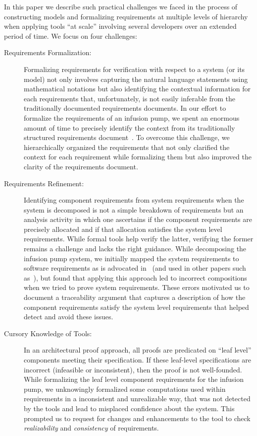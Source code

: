In this paper we describe such practical challenges we faced in the process of constructing models and formalizing requirements at multiple levels of hierarchy when applying tools ``at scale'' involving several developers over an extended period of time.  We focus on four challenges:
\begin{description}
        \item[Requirements Formalization:] Formalizing requirements for verification with respect to a system (or its model) not only involves capturing the natural language statements using mathematical notations but also identifying the contextual information for each requirements that, unfortunately, is not easily inferable from the traditionally documented requirements documents. In our effort to formalize the requirements of an infusion pump, we spent an enormous amount of time to precisely identify the context from its traditionally structured requirements document~\cite{IEEESRS}. To overcome this challenge, we hierarchically organized the requirements that not only clarified the context for each requirement while formalizing them but also improved the clarity of the requirements document.
            
    \item[Requirements Refinement:] Identifying component requirements from system requirements when the system is decomposed is not a simple breakdown of requirements but an analysis activity in which one ascertains if the component requirements are precisely allocated and if that allocation satisfies the system level requirements. While formal tools help verify the latter, verifying the former remains a challenge and lacks the right guidance. While decomposing the infusion pump system, we initially mapped the system requirements to software requirements as is advocated in~\cite{Miller01:dasc} (and used in other papers such as~\cite{Jeffords:2010:MCV:1938390.1938407,Kauppinen07:re}), but found that applying this approach led to incorrect compositions when we tried to prove system requirements. These errors motivated us to document a traceability argument that captures a description of how the component requirements satisfy the system level requirements that helped detect and avoid these issues.
        
    \item[Cursory Knowledge of Tools:] In an architectural proof approach, all proofs are predicated on ``leaf level'' components meeting their specification.  If these leaf-level specifications are incorrect (infeasible or inconsistent), then the proof is not well-founded. While formalizing the leaf level component requirements for the infusion pump, we unknowingly formalized some computations used within requirements in a inconsistent and unrealizable way, that was not detected by the tools and lead to misplaced confidence about the system. This prompted us to request for changes and enhancements to the tool to check {\em realizability} and {\em consistency} of requirements.
        

\end{description}
